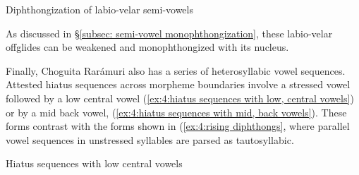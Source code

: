 
\ea\label{ex:4:diphthongization of labio-velar semi-vowels1}
{Diphthongization of labio-velar semi-vowels}

    \z
\z

As discussed in §\ref{subsec: semi-vowel monophthongization}, these labio-velar offglides can be weakened and monophthongized with its nucleus.

Finally, Choguita Rarámuri also has a series of heterosyllabic vowel sequences. Attested hiatus sequences across morpheme boundaries involve a stressed vowel followed by a low central vowel (\ref{ex:4:hiatus sequences with low, central vowels}) or by a mid back vowel, (\ref{ex:4:hiatus sequences with mid, back vowels}). These forms contrast with the forms shown in (\ref{ex:4:rising diphthongs}, where parallel vowel sequences in unstressed syllables are parsed as tautosyllabic.

\ea\label{ex:4:hiatus sequences with low, central vowels}
{Hiatus sequences with low central vowels }

